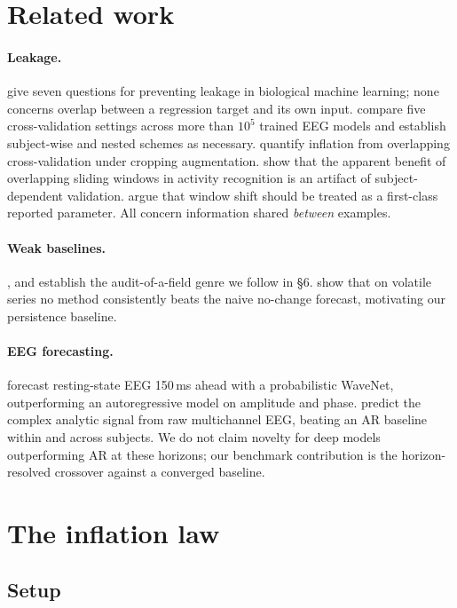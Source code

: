 \documentclass{article}
\begin{document}
\section{Related work}

\paragraph{Leakage.} \citet{bernett2024} give seven questions for preventing
leakage in biological machine learning; none concerns overlap between a regression
target and its own input. \citet{delpup2025} compare five cross-validation
settings across more than $10^5$ trained EEG models and establish subject-wise and
nested schemes as necessary. \citet{lee2023} quantify inflation from overlapping
cross-validation under cropping augmentation. \citet{dehghani2019} show that the
apparent benefit of overlapping sliding windows in activity recognition is an
artifact of subject-dependent validation. \citet{wosiak2025} argue that window
shift should be treated as a first-class reported parameter. All concern
information shared \emph{between} examples.

\paragraph{Weak baselines.} \citet{mcgreivy2024}, \citet{lin2019} and
\citet{yang2019} establish the audit-of-a-field genre we follow in \S6.
\citet{beck2025} show that on volatile series no method consistently beats the
naive no-change forecast, motivating our persistence baseline.

\paragraph{EEG forecasting.} \citet{pankka2024} forecast resting-state EEG
150\,ms ahead with a probabilistic WaveNet, outperforming an autoregressive model
on amplitude and phase. \citet{onojima2025} predict the complex analytic signal
from raw multichannel EEG, beating an AR baseline within and across subjects. We
do not claim novelty for deep models outperforming AR at these horizons; our
benchmark contribution is the horizon-resolved crossover against a converged
baseline.

\section{The inflation law}

\subsection{Setup}
\end{document}
